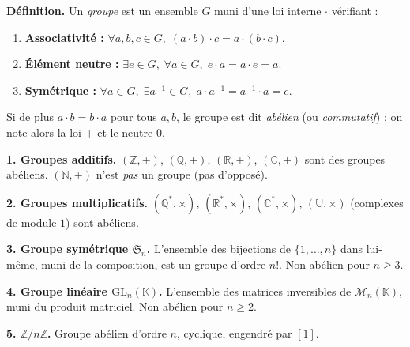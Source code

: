 ﻿%



\begin{tcolorbox}[thmbox]
  \textbf{Définition.}\enspace%
  Un \emph{groupe} est un ensemble $G$ muni d'une loi interne $\cdot$ vérifiant :
  \begin{enumerate}
    \item[\textbf{G1.}] \textbf{Associativité :} $\forall a,b,c \in G,\; (a\cdot b)\cdot c = a\cdot(b\cdot c)$.
    \item[\textbf{G2.}] \textbf{Élément neutre :} $\exists e \in G,\; \forall a \in G,\; e\cdot a = a\cdot e = a$.
    \item[\textbf{G3.}] \textbf{Symétrique :} $\forall a \in G,\; \exists a^{-1} \in G,\;
          a\cdot a^{-1} = a^{-1}\cdot a = e$.
  \end{enumerate}
  Si de plus $a \cdot b = b \cdot a$ pour tous $a, b$, le groupe est dit
  \emph{abélien} (ou \emph{commutatif}) ; on note alors la loi $+$ et le neutre $0$.
\end{tcolorbox}


\begin{mdframed}[style=exbar]
  \textbf{1. Groupes additifs.}\enspace%
  $(\mathbb{Z},+)$, $(\mathbb{Q},+)$, $(\mathbb{R},+)$, $(\mathbb{C},+)$
  sont des groupes abéliens. $(\mathbb{N},+)$ n'est \emph{pas} un groupe
  (pas d'opposé).

  \smallskip\noindent
  \textbf{2. Groupes multiplicatifs.}\enspace%
  $(\mathbb{Q}^*,\times)$, $(\mathbb{R}^*,\times)$, $(\mathbb{C}^*,\times)$,
  $(\mathbb{U},\times)$ (complexes de module $1$) sont abéliens.

  \smallskip\noindent
  \textbf{3. Groupe symétrique $\mathfrak{S}_n$.}\enspace%
  L'ensemble des bijections de $\{1,\ldots,n\}$ dans lui-même, muni de la
  composition, est un groupe d'ordre $n!$. Non abélien pour $n \geq 3$.

  \smallskip\noindent
  \textbf{4. Groupe linéaire $\mathrm{GL}_n(\mathbb{K})$.}\enspace%
  L'ensemble des matrices inversibles de $\mathcal{M}_n(\mathbb{K})$, muni du produit matriciel.
  Non abélien pour $n \geq 2$.

  \smallskip\noindent
  \textbf{5. $\mathbb{Z}/n\mathbb{Z}$.}\enspace%
  Groupe abélien d'ordre $n$, cyclique, engendré par $[1]$.
\end{mdframed}

